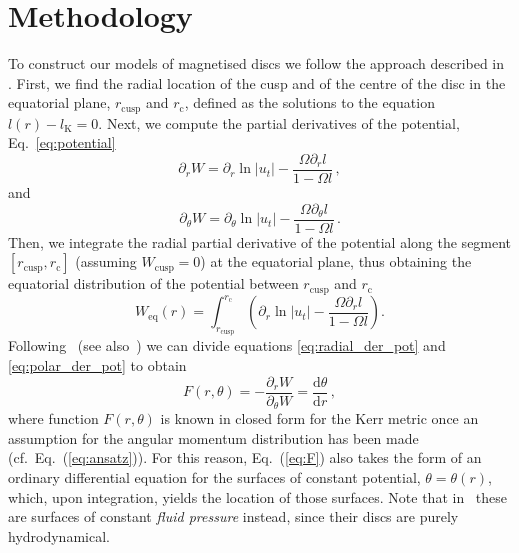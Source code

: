 \documentclass[referee]{aa}
\begin{document}
\section{Methodology}
\label{methodology}

To construct our models of magnetised discs we follow the approach described in \citet{Qian:2009}. First, we find the radial location of the cusp and of the centre of the disc in the equatorial plane, $r_{\mathrm{cusp}}$ and $r_{\mathrm{c}}$, defined as the solutions to the equation $l(r) - l_{\mathrm{K}} = 0$.
Next, we compute the partial derivatives of the potential, Eq.~\eqref{eq:potential}
\begin{equation}\label{eq:radial_der_pot}
\partial_r W = \partial_r \ln|u_t| - \frac{\Omega \partial_rl}{1 - \Omega l}\,,
\end{equation}
and
\begin{equation}\label{eq:polar_der_pot}
\partial_{\theta} W = \partial_{\theta} \ln|u_t| - \frac{\Omega \partial_{\theta}l}{1 - \Omega l}\,.
\end{equation}
Then, we integrate the radial partial derivative of the potential along the segment $[r_{\mathrm{cusp}}, r_{\mathrm{c}}]$ (assuming $W_{\mathrm{cusp}} = 0$) at the equatorial plane, thus obtaining the equatorial distribution of the potential between $r_{\mathrm{cusp}}$ and $r_{\mathrm{c}}$
\begin{equation}\label{eq:equatorial_pot}
W_{\mathrm{eq}}(r) = \int^{r_{\mathrm{c}}}_{r_{\mathrm{cusp}}}\left(\partial_r \ln|u_t| - \frac{\Omega \partial_rl}{1 - \Omega l}\right).
\end{equation}
Following~\citet{Qian:2009} (see also~\citet{Jaroszynski:1980}) we can divide equations \eqref{eq:radial_der_pot} and \eqref{eq:polar_der_pot} to obtain
\begin{equation}\label{eq:F}
F(r, \theta) = -\frac{\partial_r W}{\partial_{\theta} W} = \frac{\mathrm{d}\theta}{\mathrm{d}r}\,,
\end{equation}
where function $F(r, \theta)$ is known in closed form for the Kerr metric once an assumption for the angular momentum distribution has been made (cf.~Eq.~(\ref{eq:ansatz})). For this reason, Eq.~(\ref{eq:F}) also takes the form of an ordinary differential equation for the surfaces of constant potential, $\theta=\theta(r)$, which, upon integration, yields the location of those surfaces. Note that in~\citet{Qian:2009} these are surfaces of constant {\it fluid pressure} instead, since their discs are purely hydrodynamical.
\end{document}
